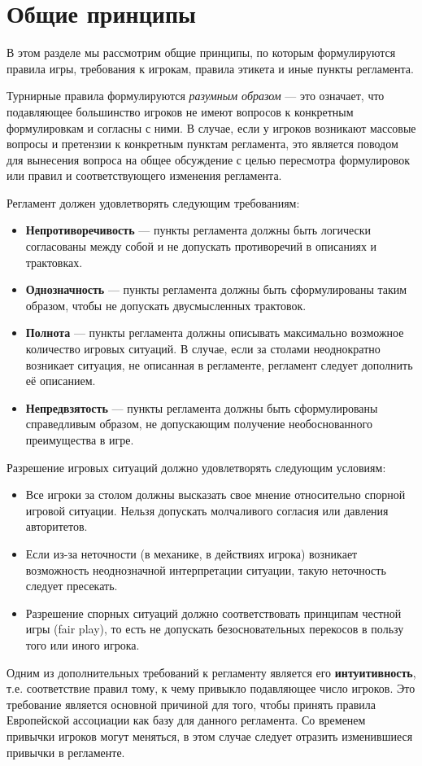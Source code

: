 \section{Общие принципы}


В этом разделе мы рассмотрим общие принципы, по которым формулируются правила игры, требования к игрокам, правила этикета и иные пункты регламента.

Турнирные правила формулируются \textit{разумным образом} --- это означает, что подавляющее большинство игроков не имеют вопросов к конкретным формулировкам и согласны с ними. В случае, если у игроков возникают массовые вопросы и претензии к конкретным пунктам регламента, это является поводом для вынесения вопроса на общее обсуждение с целью пересмотра формулировок или правил и соответствующего изменения регламента.

Регламент должен удовлетворять следующим требованиям:
\begin{itemize}
	\item \textbf{Непротиворечивость} --- пункты регламента должны быть логически согласованы между собой и не допускать противоречий в описаниях и трактовках.
	\item \textbf{Однозначность} --- пункты регламента должны быть сформулированы таким образом, чтобы не допускать двусмысленных трактовок.
	\item \textbf{Полнота} --- пункты регламента должны описывать максимально возможное количество игровых ситуаций. В случае, если за столами неоднократно возникает ситуация, не описанная в регламенте, регламент следует дополнить её описанием.
	\item \textbf{Непредвзятость} --- пункты регламента должны быть сформулированы справедливым образом, не допускающим получение необоснованного преимущества в игре.
\end{itemize}

Разрешение игровых ситуаций должно удовлетворять следующим условиям:
\begin{itemize}
	\item Все игроки за столом должны высказать свое мнение относительно спорной игровой ситуации. Нельзя допускать молчаливого согласия или давления авторитетов.
	\item Если из-за неточности (в механике, в действиях игрока) возникает возможность неоднозначной интерпретации ситуации, такую неточность следует пресекать.
	\item Разрешение спорных ситуаций должно соответствовать принципам честной игры (fair play), то есть не допускать безосновательных перекосов в пользу того или иного игрока.
\end{itemize}

Одним из дополнительных требований к регламенту является его \textbf{интуитивность}, т.е. соответствие правил тому, к чему привыкло подавляющее число игроков. Это требование является основной причиной для того, чтобы принять правила Европейской ассоциации как базу для данного регламента. Со временем привычки игроков могут меняться, в этом случае следует отразить изменившиеся привычки в регламенте.


